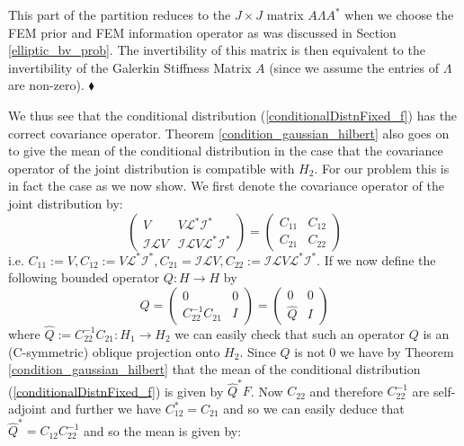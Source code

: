 \begin{remark}
    This part of the partition reduces to the $J\times J$ matrix $A\Lambda A^{*}$ when we choose the FEM prior and FEM information operator as was discussed in Section \textcolor{blue}{\ref{elliptic_bv_prob}}. The invertibility of this matrix is then equivalent to the invertibility of the Galerkin Stiffness Matrix $A$ (since we assume the entries of $\Lambda$ are non-zero). $\mathbin{\blacklozenge}$
\end{remark}
We thus see that the conditional distribution (\ref{conditionalDistnFixed_f}) has the correct covariance operator. Theorem \textcolor{blue}{\ref{condition_gaussian_hilbert}} also goes on to give the mean of the conditional distribution in the case that the covariance operator of the joint distribution is compatible with $H_{2}$. For our problem this is in fact the case as we now show. We first denote the covariance operator of the joint distribution by:
\begin{equation*}
    \begin{pmatrix}
        V & V\mathcal{L}^{*}\mathcal{I}^{*} \\
        \mathcal{I}\mathcal{L}V & \mathcal{I}\mathcal{L}V\mathcal{L}^{*}\mathcal{I}^{*}
    \end{pmatrix}=
    \begin{pmatrix}
        C_{11} & C_{12} \\
        C_{21} & C_{22}
    \end{pmatrix}
\end{equation*}
i.e. $C_{11}:=V, C_{12}:=V\mathcal{L}^{*}\mathcal{I}^{*},C_{21}=\mathcal{I}\mathcal{L}V,C_{22}:=\mathcal{I}\mathcal{L}V\mathcal{L}^{*}\mathcal{I}^{*}$. If we now define the following bounded operator $Q:H\rightarrow H$ by
\begin{equation*}
    Q = \begin{pmatrix}
            0 & 0 \\
            C_{22}^{-1}C_{21} & I
        \end{pmatrix} =
        \begin{pmatrix}
            0 & 0 \\
            \hat{Q} & I
        \end{pmatrix}
\end{equation*}
where $\hat{Q}:=C_{22}^{-1}C_{21}:H_{1}\rightarrow H_{2}$ we can easily check that such an operator $Q$ is an (C-symmetric) oblique projection onto $H_{2}$. Since $Q$ is not $0$ we have by Theorem \textcolor{blue}{\ref{condition_gaussian_hilbert}} that the mean of the conditional distribution (\ref{conditionalDistnFixed_f}) is given by $\hat{Q}^{*}F$. Now $C_{22}$ and therefore $C_{22}^{-1}$ are self-adjoint and further we have $C_{12}^{*}=C_{21}$ and so we can easily deduce that $\hat{Q}^{*}=C_{12}C_{22}^{-1}$ and so the mean is given by:
